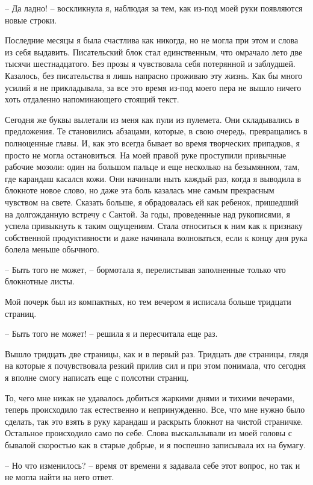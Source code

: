 \documentclass[
]{book}
\begin{document}
-- Да ладно! -- воскликнула я, наблюдая за тем, как из-под моей руки появляются новые строки.

Последние месяцы я была счастлива как никогда, но не могла при этом и слова из себя выдавить. Писательский блок стал единственным, что омрачало лето две тысячи шестнадцатого. Без прозы я чувствовала себя потерянной и заблудшей. Казалось, без писательства я лишь напрасно проживаю эту жизнь. Как бы много усилий я не прикладывала, за все это время из-под моего пера не вышло ничего хоть отдаленно напоминающего стоящий текст.

Сегодня же буквы вылетали из меня как пули из пулемета. Они складывались в предложения. Те становились абзацами, которые, в свою очередь, превращались в полноценные главы. И, как это всегда бывает во время творческих припадков, я просто не могла остановиться. На моей правой руке проступили привычные рабочие мозоли: один на большом пальце и еще несколько на безымянном, там, где карандаш касался кожи. Они начинали ныть каждый раз, когда я выводила в блокноте новое слово, но даже эта боль казалась мне самым прекрасным чувством на свете. Сказать больше, я обрадовалась ей как ребенок, пришедший на долгожданную встречу с Сантой. За годы, проведенные над рукописями, я успела привыкнуть к таким ощущениям. Стала относиться к ним как к признаку собственной продуктивности и даже начинала волноваться, если к концу дня рука болела меньше обычного.

-- Быть того не может, -- бормотала я, перелистывая заполненные только что блокнотные листы.

Мой почерк был из компактных, но тем вечером я исписала больше тридцати страниц.

-- Быть того не может! -- решила я и пересчитала еще раз.

Вышло тридцать две страницы, как и в первый раз. Тридцать две страницы, глядя на которые я почувствовала резкий прилив сил и при этом понимала, что сегодня я вполне смогу написать еще с полсотни страниц.

То, чего мне никак не удавалось добиться жаркими днями и тихими вечерами, теперь происходило так естественно и непринужденно. Все, что мне нужно было сделать, так это взять в руку карандаш и раскрыть блокнот на чистой страничке. Остальное происходило само по себе. Слова выскальзывали из моей головы с бывалой скоростью как в старые добрые, и я поспешно записывала их на бумагу.

-- Но что изменилось? -- время от времени я задавала себе этот вопрос, но так и не могла найти на него ответ.
\end{document}

